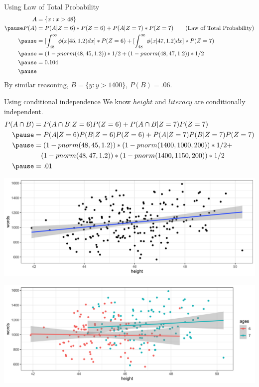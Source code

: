 \documentclass[aspectratio=169, handout]{beamer}
\numberwithin{equation}{section}
\begin{document}
\begin{frame}{Using Law of Total Probability}
\begin{align*}
A&=\{x: x>48\}\\\pause 
P(A)&=P(A|Z=6)*P(Z=6)+P(A|Z=7)*P(Z=7) \tag{Law of Total Probability}\\\pause 
&=[\int_{48}^\infty \phi(x|45,1.2)dx]*P(Z=6)+[\int_{48}^\infty \phi(x|47,1.2)dx]*P(Z=7)\\\pause 
&=(1-pnorm(48, 45, 1.2) )*1/2+(1-pnorm(48, 47, 1.2) )*1/2\\\pause 
&=0.104\\\pause 
\end{align*}
By similar reasoning, $B=\{y: y>1400\}$, $P(B)=.06$.\\
\end{frame}




\begin{frame}{Using conditional independence}
We know $height$ and $literacy$ are conditionally independent.
\begin{align*}
P(A\cap B)&=P(A\cap B|Z=6)P(Z=6)+P(A\cap B|Z=7)P(Z=7)\\ \pause
&=P(A|Z=6)P(B|Z=6)P(Z=6)+P(A|Z=7)P(B|Z=7)P(Z=7)\\\pause
&=(1-pnorm(48, 45,1.2) )*(1-pnorm(1400, 1000, 200) )*1/2+\\
&\quad (1-pnorm(48, 47, 1.2) )*(1-pnorm(1400, 1150, 200) )*1/2 \\\pause
&=.01
\end{align*}
\end{frame}

\begin{frame}
\begin{center}
\includegraphics[width=5 in]{images/Heightwords.png}
\end{center}
\end{frame}

\begin{frame}
\begin{center}
\includegraphics[width=5 in]{images/Heightwordsage.png}
\end{center}
\end{frame}
\end{document}
